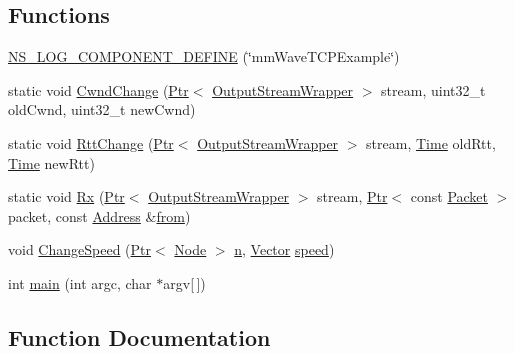 \subsection*{Functions}
\begin{DoxyCompactItemize}
\item 
\hyperlink{mmwave-tcp-building-example_8cc_a9613ed3ca17e75d3ac4c66a21d3ad4e8}{N\+S\+\_\+\+L\+O\+G\+\_\+\+C\+O\+M\+P\+O\+N\+E\+N\+T\+\_\+\+D\+E\+F\+I\+NE} (\char`\"{}mm\+Wave\+T\+C\+P\+Example\char`\"{})
\item 
static void \hyperlink{mmwave-tcp-building-example_8cc_a029700a26394b63e7e4f8fe0dc2a3e0d}{Cwnd\+Change} (\hyperlink{classns3_1_1Ptr}{Ptr}$<$ \hyperlink{classns3_1_1OutputStreamWrapper}{Output\+Stream\+Wrapper} $>$ stream, uint32\+\_\+t old\+Cwnd, uint32\+\_\+t new\+Cwnd)
\item 
static void \hyperlink{mmwave-tcp-building-example_8cc_a9490f3a2b4f07bb82ec1024befcb57a8}{Rtt\+Change} (\hyperlink{classns3_1_1Ptr}{Ptr}$<$ \hyperlink{classns3_1_1OutputStreamWrapper}{Output\+Stream\+Wrapper} $>$ stream, \hyperlink{classns3_1_1Time}{Time} old\+Rtt, \hyperlink{classns3_1_1Time}{Time} new\+Rtt)
\item 
static void \hyperlink{mmwave-tcp-building-example_8cc_a44926b91325d01c8749a8e4728a65087}{Rx} (\hyperlink{classns3_1_1Ptr}{Ptr}$<$ \hyperlink{classns3_1_1OutputStreamWrapper}{Output\+Stream\+Wrapper} $>$ stream, \hyperlink{classns3_1_1Ptr}{Ptr}$<$ const \hyperlink{classns3_1_1Packet}{Packet} $>$ packet, const \hyperlink{classns3_1_1Address}{Address} \&\hyperlink{lte__amc_8m_a1b4c81ff74eb1a626b5ade44c81004b3}{from})
\item 
void \hyperlink{mmwave-tcp-building-example_8cc_a1fe18c61b129ac2c333ca0c841e280ee}{Change\+Speed} (\hyperlink{classns3_1_1Ptr}{Ptr}$<$ \hyperlink{classns3_1_1Node}{Node} $>$ \hyperlink{lte__link__budget__x2__handover__measures_8m_abdb05bc5a064cf642a06c83b3392f148}{n}, \hyperlink{classns3_1_1Vector3D_a7e59b47bc94c9cb1dadff68c1d0112d8}{Vector} \hyperlink{mmwave-amc-test_8cc_a6dc6e6f3c75c509ce943163afb5dade7}{speed})
\item 
int \hyperlink{mmwave-tcp-building-example_8cc_a0ddf1224851353fc92bfbff6f499fa97}{main} (int argc, char $\ast$argv\mbox{[}$\,$\mbox{]})
\end{DoxyCompactItemize}


\subsection{Function Documentation}
